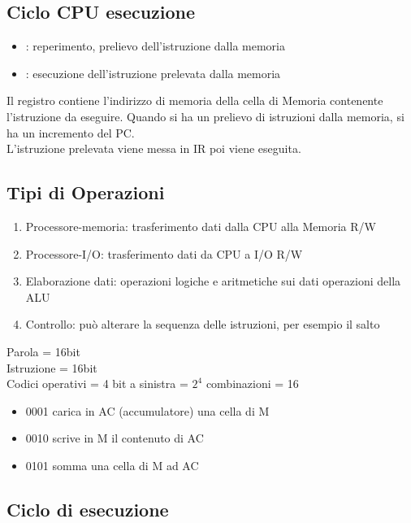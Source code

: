 \documentclass[12pt, a4paper]{article}
\begin{document}
\subsection{Ciclo CPU esecuzione}
\begin{itemize}
	\item {}: reperimento, prelievo dell'istruzione dalla memoria
	\item {}: esecuzione dell'istruzione prelevata dalla memoria
\end{itemize}
Il registro  contiene l'indirizzo di memoria della
cella di Memoria contenente l'istruzione da eseguire.
Quando si ha un prelievo di istruzioni dalla memoria, si ha un incremento del PC.\\
L'istruzione prelevata viene messa in IR poi viene eseguita.


\subsection{Tipi di Operazioni}

\begin{enumerate}
	\item Processore-memoria: trasferimento dati dalla CPU alla Memoria R/W
	\item Processore-I/O: trasferimento dati da CPU a I/O               R/W
	\item Elaborazione dati: operazioni logiche e aritmetiche sui dati
		operazioni della ALU
	\item Controllo: può alterare la sequenza delle istruzioni, per esempio
		il salto
\end{enumerate}

\begin{esem}	
Parola = 16bit\\
Istruzione = 16bit\\
Codici operativi = 4 bit a sinistra = $2^4$ combinazioni = 16\\

\begin{itemize}
	\item 0001 carica in AC (accumulatore) una cella di M
	\item 0010 scrive in M il contenuto di AC
	\item 0101 somma una cella di M ad AC
\end{itemize}
\end{esem}

\subsection{Ciclo di esecuzione}
\end{document}
